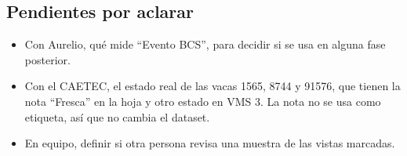 \subsection{Pendientes por aclarar}

\begin{itemize}
  \item Con Aurelio, qué mide ``Evento BCS'', para decidir si se usa en alguna fase posterior.
  \item Con el CAETEC, el estado real de las vacas 1565, 8744 y 91576, que tienen la nota ``Fresca'' en la hoja y otro estado en VMS 3. La nota no se usa como etiqueta, así que no cambia el dataset.
  \item En equipo, definir si otra persona revisa una muestra de las vistas marcadas.
\end{itemize}
